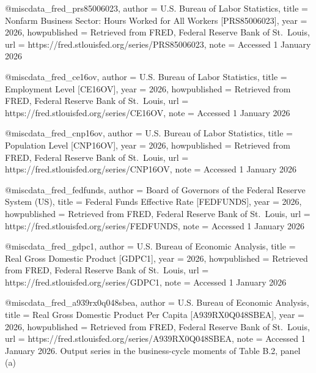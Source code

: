 @misc{data_fred_prs85006023,
  author       = {{U.S. Bureau of Labor Statistics}},
  title        = {Nonfarm Business Sector: Hours Worked for All Workers [{PRS85006023}]},
  year         = {2026},
  howpublished = {Retrieved from {FRED}, Federal Reserve Bank of St.\ Louis},
  url          = {https://fred.stlouisfed.org/series/PRS85006023},
  note         = {Accessed 1 January 2026}
}

@misc{data_fred_ce16ov,
  author       = {{U.S. Bureau of Labor Statistics}},
  title        = {Employment Level [{CE16OV}]},
  year         = {2026},
  howpublished = {Retrieved from {FRED}, Federal Reserve Bank of St.\ Louis},
  url          = {https://fred.stlouisfed.org/series/CE16OV},
  note         = {Accessed 1 January 2026}
}

@misc{data_fred_cnp16ov,
  author       = {{U.S. Bureau of Labor Statistics}},
  title        = {Population Level [{CNP16OV}]},
  year         = {2026},
  howpublished = {Retrieved from {FRED}, Federal Reserve Bank of St.\ Louis},
  url          = {https://fred.stlouisfed.org/series/CNP16OV},
  note         = {Accessed 1 January 2026}
}


@misc{data_fred_fedfunds,
  author       = {{Board of Governors of the Federal Reserve System (US)}},
  title        = {Federal Funds Effective Rate [{FEDFUNDS}]},
  year         = {2026},
  howpublished = {Retrieved from {FRED}, Federal Reserve Bank of St.\ Louis},
  url          = {https://fred.stlouisfed.org/series/FEDFUNDS},
  note         = {Accessed 1 January 2026}
}


@misc{data_fred_gdpc1,
  author       = {{U.S. Bureau of Economic Analysis}},
  title        = {Real Gross Domestic Product [{GDPC1}]},
  year         = {2026},
  howpublished = {Retrieved from {FRED}, Federal Reserve Bank of St.\ Louis},
  url          = {https://fred.stlouisfed.org/series/GDPC1},
  note         = {Accessed 1 January 2026}
}

@misc{data_fred_a939rx0q048sbea,
  author       = {{U.S. Bureau of Economic Analysis}},
  title        = {Real Gross Domestic Product Per Capita [{A939RX0Q048SBEA}]},
  year         = {2026},
  howpublished = {Retrieved from {FRED}, Federal Reserve Bank of St.\ Louis},
  url          = {https://fred.stlouisfed.org/series/A939RX0Q048SBEA},
  note         = {Accessed 1 January 2026. Output series in the business-cycle moments of Table B.2, panel (a)}
}

